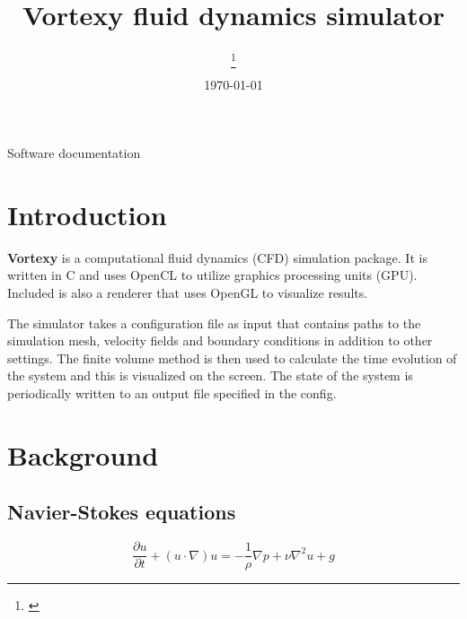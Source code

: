 \documentclass[12pt]{article}
\title {
  Vortexy fluid dynamics simulator
}
\date{\today}
\author[1] {
   \firstauth\thanks{\href{mailto: \email}{\email}}
}
\begin{document}
\setlength{\belowcaptionskip}{10pt}


\normalsize

\begin{titlingpage}
  \maketitle

  \begin{center}
  Software documentation
\end{center}
\end{titlingpage}

\newpage

\tableofcontents

\newpage

\section{Introduction}

{\bf Vortexy} is a computational fluid dynamics (CFD) simulation package. It is written in C and uses OpenCL to utilize graphics processing units (GPU). Included is also a renderer that uses OpenGL to visualize results.

The simulator takes a configuration file as input that contains paths to the simulation mesh, velocity fields and boundary conditions in addition to other settings. The finite volume method is then used to calculate the time evolution of the system and this is visualized on the screen. The state of the system is periodically written to an output file specified in the config.


\section{Background}

\subsection{Navier-Stokes equations}

\begin{equation}
  \frac{\partial u}{\partial t} + (u \cdot \nabla) u = -\frac{1}{\rho} \nabla p + \nu \nabla^2 u + g
\end{equation}
\end{document}
